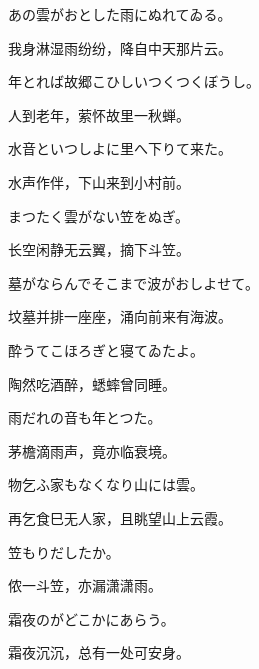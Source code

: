 \begin{haiku}
    {\FH あの雲がおとした雨にぬれてゐる。}

    {\FK 我身淋湿雨纷纷，降自中天那片云。}
\end{haiku}

\begin{haiku}
    {\FH 年とれば故郷こひしいつくつくぼうし。}

    {\FK 人到老年，萦怀故里一秋蝉。}
\end{haiku}

\begin{haiku}
    {\FH 水音といつしよに里へ下りて来た。}

    {\FK 水声作伴，下山来到小村前。}
\end{haiku}

\begin{haiku}
    {\FH まつたく雲がない笠をぬぎ。}

    {\FK 长空闲静无云翼，摘下斗笠。}
\end{haiku}

\begin{haiku}
    {\FH 墓がならんでそこまで波がおしよせて。}

    {\FK 坟墓并排一座座，涌向前来有海波。}
\end{haiku}

\begin{haiku}
    {\FH 酔うてこほろぎと寝てゐたよ。}

    {\FK 陶然吃酒醉，蟋蟀曾同睡。}
\end{haiku}

\begin{haiku}
    {\FH 雨だれの音も年とつた。}

    {\FK 茅檐滴雨声，竟亦临衰境。}
\end{haiku}

\begin{haiku}
    {\FH 物乞ふ家もなくなり山には雲。}

    {\FK 再乞食巳无人家，且眺望山上云霞。}
\end{haiku}

\begin{haiku}
    {\FH 笠もりだしたか。}

    {\FK 侬一斗笠，亦漏潇潇雨。}
\end{haiku}

\begin{haiku}
    {\FH 霜夜のがどこかにあらう。}

    {\FK 霜夜沉沉，总有一处可安身。}
\end{haiku}

